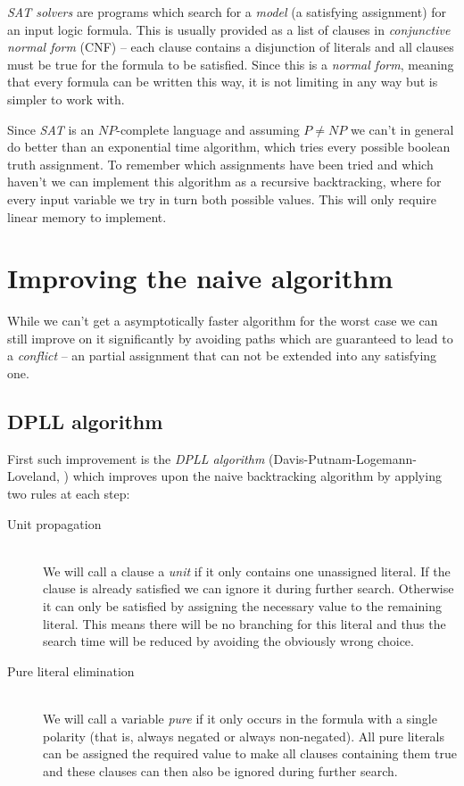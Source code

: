 \emph{SAT solvers} are programs which search for a \emph{model} (a satisfying assignment) for an input logic formula.
This is usually provided as a list of clauses in \emph{conjunctive normal form} (CNF) -- each clause contains a disjunction of literals and all clauses must be true for the formula to be satisfied.
Since this is a \emph{normal form}, meaning that every formula can be written this way, it is not limiting in any way but is simpler to work with.

Since \emph{SAT} is an $NP$-complete language and assuming $P \neq NP$ we can't in general do better than an exponential time algorithm, which tries every possible boolean truth assignment.
To remember which assignments have been tried and which haven't we can implement this algorithm as a recursive backtracking, where for every input variable we try in turn both possible values.
This will only require linear memory to implement.

\section{Improving the naive algorithm}

While we can't get a asymptotically faster algorithm for the worst case we can still improve on it significantly by avoiding paths which are guaranteed to lead to a \emph{conflict} -- an partial assignment that can not be extended into any satisfying one.

\subsection{DPLL algorithm}

First such improvement is the \emph{DPLL algorithm} (Davis-Putnam-Logemann-Loveland, \citep{davis1960computing,davis1962machine}) which improves upon the naive backtracking algorithm by applying two rules at each step:

\begin{description}
\item[Unit propagation] \hfill \\
We will call a clause a \emph{unit} if it only contains one unassigned literal.
If the clause is already satisfied we can ignore it during further search.
Otherwise it can only be satisfied by assigning the necessary value to the remaining literal.
This means there will be no branching for this literal and thus the search time will be reduced by avoiding the obviously wrong choice.

\item[Pure literal elimination] \hfill \\
We will call a variable \emph{pure} if it only occurs in the formula with a single polarity (that is, always negated or always non-negated).
All pure literals can be assigned the required value to make all clauses containing them true and these clauses can then also be ignored during further search.
\end{description}


